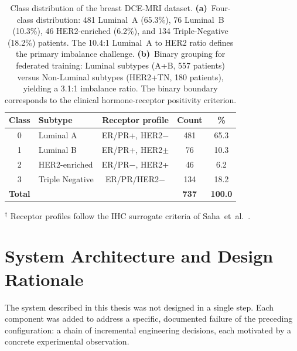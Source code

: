 \begin{table}[htbp]
  \centering
  \caption[Class distribution and binary reformulation]{%
    Class distribution of the breast DCE-MRI dataset.
    \textbf{(a)}~Four-class distribution: 481 Luminal~A
    (65.3\%), 76 Luminal~B (10.3\%), 46 HER2-enriched
    (6.2\%), and 134 Triple-Negative (18.2\%) patients.
    The 10.4:1 Luminal~A to HER2 ratio defines the
    primary imbalance challenge.
    \textbf{(b)}~Binary grouping for federated training:
    Luminal subtypes (A+B, 557 patients) versus
    Non-Luminal subtypes (HER2+TN, 180 patients),
    yielding a 3.1:1 imbalance ratio.
    The binary boundary corresponds to the clinical
    hormone-receptor positivity criterion.}
  \label{tab:class-distribution}
  \renewcommand{\arraystretch}{1.3}
  \begin{tabular}{clccc}
    \toprule
    \textbf{Class} & \textbf{Subtype} & \textbf{Receptor profile}
      & \textbf{Count} & \textbf{\%} \\
    \midrule
    0 & Luminal A       & ER/PR+, HER2$-$ & 481 & 65.3 \\
    1 & Luminal B       & ER/PR+, HER2$\pm$ &  76 & 10.3 \\
    2 & HER2-enriched   & ER/PR$-$, HER2+ &  46 &  6.2 \\
    3 & Triple Negative & ER/PR/HER2$-$   & 134 & 18.2 \\
    \midrule
    \multicolumn{3}{l}{\textbf{Total}} & \textbf{737} & \textbf{100.0} \\
    \bottomrule
  \end{tabular}
\begin{minipage}{\linewidth}
  \smallskip\footnotesize
  $^\dagger$ Receptor profiles follow the IHC surrogate
  criteria of Saha~et~al.\ \cite{saha2018}.
\end{minipage}
\end{table}


\section{System Architecture and Design Rationale}
\label{sec:system-arch}

The system described in this thesis was not designed
in a single step.
Each component was added to address a specific,
documented failure of the preceding configuration:
a chain of incremental engineering decisions, each
motivated by a concrete experimental observation.

